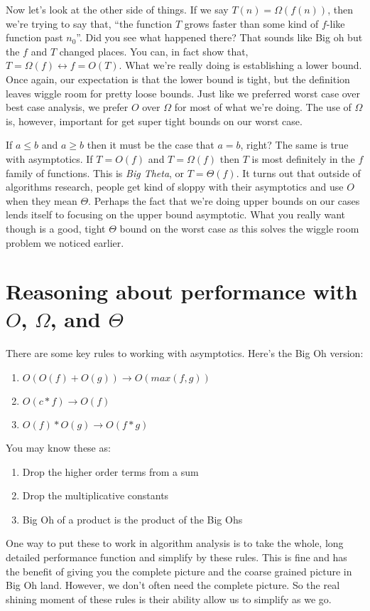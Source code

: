\documentclass[]{tufte-handout}
\begin{document}
Now let's look at the other side of things. If we say $T(n) = \Omega(f(n))$, then we're trying to say that, ``the function $T$ grows faster than some kind of $f$-like function past $n_0$''.  Did you see what happened there? That sounds like Big oh but the $f$ and $T$ changed places. You can, in fact show that, $T = \Omega(f) \leftrightarrow f = O(T)$. What we're really doing is establishing a lower bound.  Once again, our expectation is that the lower bound is tight, but the definition leaves wiggle room for pretty loose bounds.  Just like we preferred worst case over best case analysis, we prefer $O$ over $\Omega$ for most of what we're doing.  The use of $\Omega$ is, however, important for get super tight bounds on our worst case. 

If $a \leq b$ and $a \geq b$ then it must be the case that $a = b$, right? The same is true with asymptotics.  If $T = O(f)$  and $T = \Omega(f)$ then $T$ is most definitely in the $f$ family of functions.  This is \textit{Big Theta}, or $T = \Theta(f)$.  It turns out that outside of algorithms research, people get kind of sloppy with their asymptotics and use $O$ when they mean $\Theta$.  Perhaps the fact that we're doing upper bounds on our cases lends itself to focusing on the upper bound asymptotic.  What you really want though is a good, tight $\Theta$ bound on the worst case as this solves the wiggle room problem we noticed earlier. 

\section{Reasoning about performance with $O$, $\Omega$, and $\Theta$}

There are some key rules to working with asymptotics. Here's the Big Oh version:
\begin{enumerate}
\item $O(O(f) + O(g)) \rightarrow O(max(f,g))$
\item $O(c*f) \rightarrow O(f)$
\item $O(f)*O(g) \rightarrow O(f*g)$
\end{enumerate}
You may know these as:
\begin{enumerate}
\item Drop the higher order terms from a sum
\item Drop the multiplicative constants
\item Big Oh of a product is the product of the Big Ohs
\end{enumerate}
One way to put these to work in algorithm analysis is to take the whole, long detailed performance function and simplify by these rules. This is fine and has the benefit of giving you the complete picture and the coarse grained picture in Big Oh land. However, we don't often need the complete picture. So the real shining moment of these rules is their ability allow us to simplify as we go.
\end{document}
